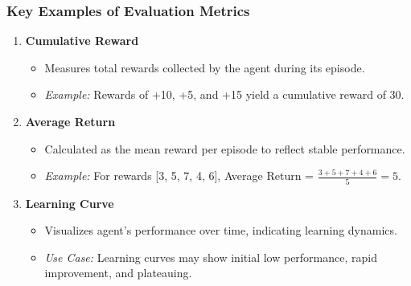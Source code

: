 \documentclass{beamer}
\begin{document}
\begin{frame}[fragile]
    \frametitle{Key Examples of Evaluation Metrics}
    
    \begin{enumerate}
        \item \textbf{Cumulative Reward}
            \begin{itemize}
                \item Measures total rewards collected by the agent during its episode.
                \item \textit{Example:} Rewards of +10, +5, and +15 yield a cumulative reward of 30.
            \end{itemize}
        
        \item \textbf{Average Return}
            \begin{itemize}
                \item Calculated as the mean reward per episode to reflect stable performance.
                \item \textit{Example:} For rewards [3, 5, 7, 4, 6], Average Return = $\frac{3+5+7+4+6}{5} = 5$.
            \end{itemize}
        
        \item \textbf{Learning Curve}
            \begin{itemize}
                \item Visualizes agent's performance over time, indicating learning dynamics.
                \item \textit{Use Case:} Learning curves may show initial low performance, rapid improvement, and plateauing.
            \end{itemize}
    \end{enumerate}
    
\end{frame}
\end{document}
